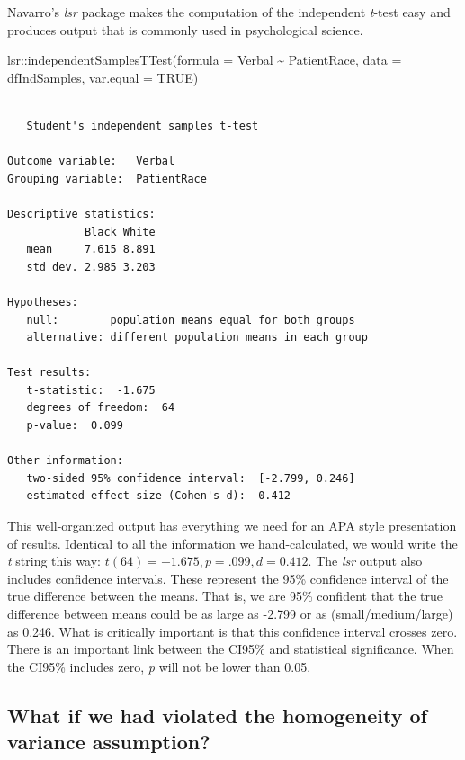 \documentclass[
  11pt,
]{book}
\newenvironment{Shaded}{\begin{snugshade}}{\end{snugshade}}
\newcommand{\AttributeTok}[1]{\textcolor[rgb]{0.77,0.63,0.00}{#1}}
\newcommand{\ConstantTok}[1]{\textcolor[rgb]{0.00,0.00,0.00}{#1}}
\newcommand{\FunctionTok}[1]{\textcolor[rgb]{0.00,0.00,0.00}{#1}}
\newcommand{\NormalTok}[1]{#1}
\newcommand{\SpecialCharTok}[1]{\textcolor[rgb]{0.00,0.00,0.00}{#1}}
\begin{document}
Navarro's \emph{lsr} package makes the computation of the independent \emph{t}-test easy and produces output that is commonly used in psychological science.

\begin{Shaded}
\begin{Highlighting}[]
\NormalTok{lsr}\SpecialCharTok{::}\FunctionTok{independentSamplesTTest}\NormalTok{(}\AttributeTok{formula =}\NormalTok{ Verbal }\SpecialCharTok{\textasciitilde{}}\NormalTok{ PatientRace, }\AttributeTok{data =}\NormalTok{ dfIndSamples,}
    \AttributeTok{var.equal =} \ConstantTok{TRUE}\NormalTok{)}
\end{Highlighting}
\end{Shaded}

\begin{verbatim}

   Student's independent samples t-test 

Outcome variable:   Verbal 
Grouping variable:  PatientRace 

Descriptive statistics: 
            Black White
   mean     7.615 8.891
   std dev. 2.985 3.203

Hypotheses: 
   null:        population means equal for both groups
   alternative: different population means in each group

Test results: 
   t-statistic:  -1.675 
   degrees of freedom:  64 
   p-value:  0.099 

Other information: 
   two-sided 95% confidence interval:  [-2.799, 0.246] 
   estimated effect size (Cohen's d):  0.412 
\end{verbatim}

This well-organized output has everything we need for an APA style presentation of results. Identical to all the information we hand-calculated, we would write the \emph{t} string this way: \(t(64) = -1.675, p = .099, d = 0.412\). The \emph{lsr} output also includes confidence intervals. These represent the 95\% confidence interval of the true difference between the means. That is, we are 95\% confident that the true difference between means could be as large as -2.799 or as (small/medium/large) as 0.246. What is critically important is that this confidence interval crosses zero. There is an important link between the CI95\% and statistical significance. When the CI95\% includes zero, \emph{p} will not be lower than 0.05.

\hypertarget{what-if-we-had-violated-the-homogeneity-of-variance-assumption}{%
\subsection{What if we had violated the homogeneity of variance assumption?}\label{what-if-we-had-violated-the-homogeneity-of-variance-assumption}}
\end{document}
